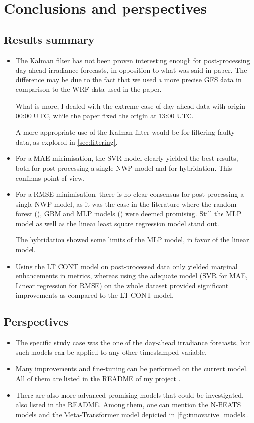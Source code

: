 \section{Conclusions and perspectives}
\subsection{Results summary}
\begin{itemize}
    \item The Kalman filter has not been proven interesting enough for post-processing day-ahead irradiance forecasts, in opposition to what was said in \cite{suksamosorn_post-processing_2021} paper. The difference may be due to the fact that we used a more precise GFS data in comparison to the WRF data used in the paper. 
    
    What is more, I dealed with the extreme case of day-ahead data with origin 00:00 UTC, while the paper fixed the origin at 13:00 UTC.

    A more appropriate use of the Kalman filter would be for filtering faulty data, as explored in \autoref{sec:filtering}.
    \item For a MAE minimisation, the SVR model clearly yielded the best results, both for post-processing a single NWP model and for hybridation. This confirms \cite{verbois_statistical_2022} point of view.
    \item For a RMSE minimisation, there is no clear consensus for post-processing a single NWP model, as it was the case in the literature where the random forest (\cite{suksamosorn_post-processing_2021}), GBM and MLP models (\cite{verbois_statistical_2022}) were deemed promising. Still the MLP model as well as the linear least square regression model stand out.

    The hybridation showed some limits of the MLP model, in favor of the linear model.
    \item Using the LT CONT model on post-processed data only yielded marginal enhancements in metrics, whereas using the adequate model (SVR for MAE, Linear regression for RMSE) on the whole dataset provided significant improvements as compared to the LT CONT model.
\end{itemize}

\subsection{Perspectives}
\begin{itemize}
    \item The specific study case was the one of the day-ahead irradiance forecasts, but such models can be applied to any other timestamped variable.
    \item Many improvements and fine-tuning can be performed on the current model. All of them are listed in the README of my project \cite{myrepo}.
    \item There are also more advanced promising models that could be investigated, also listed in the README. Among them, one can mention the N-BEATS models and the Meta-Transformer model depicted in \autoref{fig:innovative_models}.
\end{itemize}

